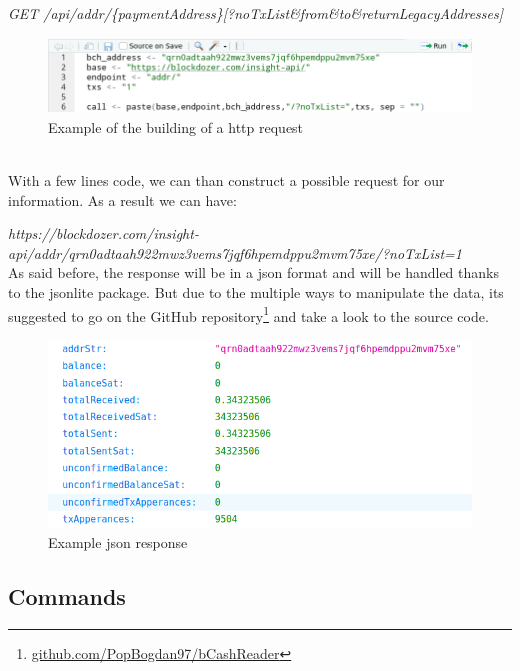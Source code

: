 \textit{GET /api/addr/\{paymentAddress\}[?noTxList\&from\&to\&returnLegacyAddresses]}
\\
\begin{figure}[h]
    \centering
    \includegraphics[height=2cm]{create_call.png}
    \caption{Example of the building of a http request}
    \label{fig:request}
\end{figure}\\
With a few lines code, we can than construct a possible request for our information. 
As a result we can have:\medskip

\textit{https://blockdozer.com/insight-api/addr/qrn0adtaah922mwz3vems7jqf6hpemdppu2mvm75xe/?noTxList=1}
\medskip\\
As said before, the response will be in a json format and will be handled thanks to the
jsonlite package. But due to the multiple ways to manipulate the data, its 
suggested to go on the GitHub repository\footnote{\url{github.com/PopBogdan97/bCashReader}} and take a look to the source code.
\begin{figure}[h]
    \centering
    \includegraphics[height=5cm]{json_sample.png}
    \caption{Example json response}
    \label{fig:response}
\end{figure}\pagebreak


\subsection{Commands}
\label{sec:commands}

